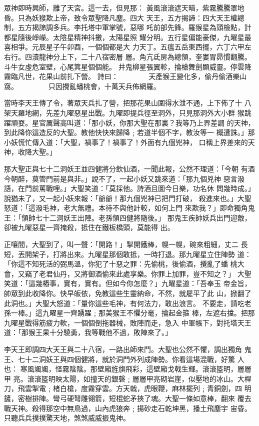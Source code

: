 \begin{pinyinscope}
{眾神即時興師，離了天宮。這一去，但見那：
黃風滾滾遮天暗，紫霧騰騰罩地昏。只為妖猴欺上帝，致令眾聖降凡塵。四大
天王，五方揭諦：四大天王權總制，五方揭諦調多兵。李托塔中軍掌號，惡哪
吒前部先鋒。羅猴星為頭檢點，計都星隨後崢嶸。太陰星精神抖擻，太陽星照
耀分明。五行星偏能豪傑，九曜星最喜相爭。元辰星子午卯酉，一個個都是大
力天丁。五瘟五岳東西擺，六丁六甲左右行。四瀆龍神分上下，二十八宿密層
層。角亢氐房為總領，奎婁胃昴慣翻騰。斗牛女虛危室壁，心尾箕星個個能。
井鬼柳星張翼軫，掄槍舞劍顯威靈。停雲降霧臨凡世，花果山前扎下營。
詩曰：
　　　　天產猴王變化多，偷丹偷酒樂山窩。
　　　　只因攪亂蟠桃會，十萬天兵佈網羅。

當時李天王傳了令，著眾天兵扎了營，把那花果山圍得水泄不通，上下佈了十
八架天羅地網，先差九曜惡星出戰。九曜即提兵徑至洞外，只見那洞外大小群
猴跳躍頑耍。星官厲聲高叫道：「那小妖，你那大聖在那裏？我等乃上界差調
的天神，到此降你這造反的大聖。教他快快來歸降﹔若道半個不字，教汝等一
概遭誅。」那小妖慌忙傳入道：「大聖，禍事了！禍事了！外面有九個兇神，
口稱上界差來的天神，收降大聖。」

那大聖正與七十二洞妖王並四健將分飲仙酒，一聞此報，公然不理道：「今朝
有酒今朝醉，莫管門前是與非。」說不了，一起小妖又跳來道：「那九個兇神
惡言潑語，在門前罵戰哩。」大聖笑道：「莫採他。詩酒且圖今日樂，功名休
問幾時成。」說猶未了，又一起小妖來報：「爺爺！那九個兇神已把門打破，
殺進來也。」大聖怒道：「這潑毛神，老大無禮。本待不與他計較，如何上門
來欺我？」即命獨角鬼王：「領帥七十二洞妖王出陣。老孫領四健將隨後。」
那鬼王疾帥妖兵出門迎敵，卻被九曜惡星一齊掩殺，抵住在鐵板橋頭，莫能得
出。

正嚷間，大聖到了，叫一聲：「開路！」掣開鐵棒，幌一幌，碗來粗細，丈二
長短，丟開架子，打將出來。九曜星那個敢抵，一時打退。那九曜星立住陣勢
道：「你這不知死活的弼馬溫，你犯了十惡之罪：先偷桃，後偷酒，攪亂了蟠
桃大會，又竊了老君仙丹，又將御酒偷來此處享樂。你罪上加罪，豈不知之？」
大聖笑道：「這幾樁事，實有，實有。但如今你怎麼？」九曜星道：「吾奉玉
帝金旨，帥眾到此收降你。快早皈依，免教這些生靈納命，不然，就屣平了此
山，掀翻了此洞也。」大聖大怒道：「量你這些毛神，有何法力，敢出浪言。
不要走，請吃老孫一棒。」這九曜星一齊踴躍﹔那美猴王不懼分毫，掄起金箍
棒，左遮右擋。把那九曜星戰得筋疲力軟，一個個倒拖器械，敗陣而走，急入
中軍帳下，對托塔天王道：「那猴王果十分驍勇，我等戰他不過，敗陣來了。」

李天王即調四大天王與二十八宿，一路出師來鬥。大聖也公然不懼，調出獨角
鬼王、七十二洞妖王與四個健將，就於洞門外列成陣勢。你看這場混戰，好驚
人也：
寒風颯颯，怪霧陰陰。那壁廂旌旗飛彩，這壁廂戈戟生輝。滾滾盔明，層層甲
亮。滾滾盔明映太陽，如撞天的銀磬﹔層層甲亮砌岩崖，似壓地的冰山。大桿
刀，飛雲掣電﹔楮白槍，度霧穿雲。方天戟，虎眼鞭，麻林擺列﹔青銅劍，四
明鏟，密樹排陣。彎弓硬弩雕翎箭，短棍蛇矛挾了魂。大聖一條如意棒，翻來
覆去戰天神。殺得那空中無鳥過，山內虎狼奔﹔揚砂走石乾坤黑，播土飛塵宇
宙昏。只聽兵兵撲撲驚天地，煞煞威威振鬼神。

}
\end{pinyinscope}
